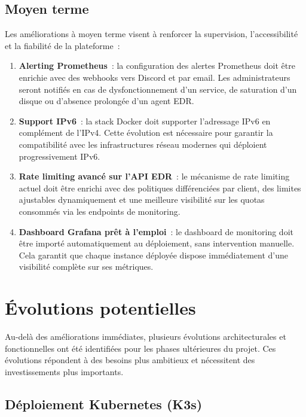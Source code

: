 \subsection{Moyen terme}

Les améliorations à moyen terme visent à renforcer la supervision,
l'accessibilité et la fiabilité de la plateforme~:

\begin{enumerate}
  \item \textbf{Alerting Prometheus}~: la configuration des alertes
    Prometheus doit être enrichie avec des webhooks vers Discord et par
    email. Les administrateurs seront notifiés en cas de dysfonctionnement
    d'un service, de saturation d'un disque ou d'absence prolongée d'un
    agent EDR.
  \item \textbf{Support IPv6}~: la stack Docker doit supporter
    l'adressage IPv6 en complément de l'IPv4. Cette évolution est
    nécessaire pour garantir la compatibilité avec les infrastructures
    réseau modernes qui déploient progressivement IPv6.
  \item \textbf{Rate limiting avancé sur l'API EDR}~: le mécanisme de
    rate limiting actuel doit être enrichi avec des politiques
    différenciées par client, des limites ajustables dynamiquement et
    une meilleure visibilité sur les quotas consommés via les endpoints
    de monitoring.
  \item \textbf{Dashboard Grafana prêt à l'emploi}~: le dashboard de
    monitoring doit être importé automatiquement au déploiement, sans
    intervention manuelle. Cela garantit que chaque instance déployée
    dispose immédiatement d'une visibilité complète sur ses métriques.
\end{enumerate}

\section{Évolutions potentielles}

Au-delà des améliorations immédiates, plusieurs évolutions
architecturales et fonctionnelles ont été identifiées pour les phases
ultérieures du projet. Ces évolutions répondent à des besoins plus
ambitieux et nécessitent des investissements plus importants.

\subsection{Déploiement Kubernetes (K3s)}


